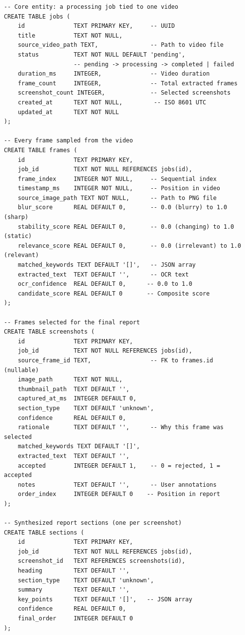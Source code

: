 \documentclass[12pt, a4paper]{article}
\begin{document}
\begin{lstlisting}[style=sql]
-- Core entity: a processing job tied to one video
CREATE TABLE jobs (
    id              TEXT PRIMARY KEY,     -- UUID
    title           TEXT NOT NULL,
    source_video_path TEXT,               -- Path to video file
    status          TEXT NOT NULL DEFAULT 'pending',
                    -- pending -> processing -> completed | failed
    duration_ms     INTEGER,              -- Video duration
    frame_count     INTEGER,              -- Total extracted frames
    screenshot_count INTEGER,             -- Selected screenshots
    created_at      TEXT NOT NULL,         -- ISO 8601 UTC
    updated_at      TEXT NOT NULL
);

-- Every frame sampled from the video
CREATE TABLE frames (
    id              TEXT PRIMARY KEY,
    job_id          TEXT NOT NULL REFERENCES jobs(id),
    frame_index     INTEGER NOT NULL,     -- Sequential index
    timestamp_ms    INTEGER NOT NULL,     -- Position in video
    source_image_path TEXT NOT NULL,      -- Path to PNG file
    blur_score      REAL DEFAULT 0,       -- 0.0 (blurry) to 1.0 (sharp)
    stability_score REAL DEFAULT 0,       -- 0.0 (changing) to 1.0 (static)
    relevance_score REAL DEFAULT 0,       -- 0.0 (irrelevant) to 1.0 (relevant)
    matched_keywords TEXT DEFAULT '[]',   -- JSON array
    extracted_text  TEXT DEFAULT '',      -- OCR text
    ocr_confidence  REAL DEFAULT 0,      -- 0.0 to 1.0
    candidate_score REAL DEFAULT 0       -- Composite score
);

-- Frames selected for the final report
CREATE TABLE screenshots (
    id              TEXT PRIMARY KEY,
    job_id          TEXT NOT NULL REFERENCES jobs(id),
    source_frame_id TEXT,                 -- FK to frames.id (nullable)
    image_path      TEXT NOT NULL,
    thumbnail_path  TEXT DEFAULT '',
    captured_at_ms  INTEGER DEFAULT 0,
    section_type    TEXT DEFAULT 'unknown',
    confidence      REAL DEFAULT 0,
    rationale       TEXT DEFAULT '',      -- Why this frame was selected
    matched_keywords TEXT DEFAULT '[]',
    extracted_text  TEXT DEFAULT '',
    accepted        INTEGER DEFAULT 1,    -- 0 = rejected, 1 = accepted
    notes           TEXT DEFAULT '',      -- User annotations
    order_index     INTEGER DEFAULT 0    -- Position in report
);

-- Synthesized report sections (one per screenshot)
CREATE TABLE sections (
    id              TEXT PRIMARY KEY,
    job_id          TEXT NOT NULL REFERENCES jobs(id),
    screenshot_id   TEXT REFERENCES screenshots(id),
    heading         TEXT DEFAULT '',
    section_type    TEXT DEFAULT 'unknown',
    summary         TEXT DEFAULT '',
    key_points      TEXT DEFAULT '[]',   -- JSON array
    confidence      REAL DEFAULT 0,
    final_order     INTEGER DEFAULT 0
);


\end{lstlisting}
\end{document}
